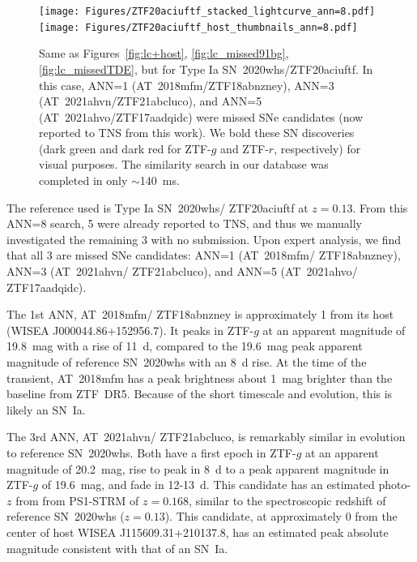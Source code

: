 \documentclass[twocolumn]{aastex63}
\begin{document}
\begin{figure}
    \centering
    \texttt{[image: Figures/ZTF20aciuftf\_stacked\_lightcurve\_ann=8.pdf]}
    \texttt{[image: Figures/ZTF20aciuftf\_host\_thumbnails\_ann=8.pdf]}
    \caption{
    Same as Figures~\ref{fig:lc+host}, \ref{fig:lc_missed91bg}, \ref{fig:lc_missedTDE}, but for Type Ia SN~2020whs/ZTF20aciuftf. In this case, ANN=1 (AT~2018mfm/ZTF18abnzney), ANN=3 (AT~2021ahvn/ZTF21abcluco), and ANN=5 (AT~2021ahvo/ZTF17aadqidc) were missed SNe candidates (now reported to TNS from this work). We bold these SN discoveries (dark green and dark red for ZTF-$g$ and ZTF-$r$, respectively) for visual purposes. The similarity search in our database was completed in only $\sim$140~ms.
    } 
    \label{fig:lc_missingSNe}
\end{figure}

The reference used is Type Ia SN~2020whs/ ZTF20aciuftf at $z=0.13$. From this ANN=8 search, 5 were already reported to TNS, and thus we manually investigated the remaining 3 with no submission. Upon expert analysis, we find that all 3 are missed SNe candidates: ANN=1 (AT~2018mfm/ ZTF18abnzney), ANN=3 (AT~2021ahvn/ ZTF21abcluco), and ANN=5 (AT~2021ahvo/ ZTF17aadqidc).

The 1st ANN, AT~2018mfm/ ZTF18abnzney is approximately 1 from its host (WISEA J000044.86+152956.7). It peaks in ZTF-$g$ at an apparent magnitude of 19.8~mag with a rise of 11~d, compared to the 19.6~mag peak apparent magnitude of reference SN~2020whs with an 8~d rise. At the time of the transient, AT~2018mfm has a peak brightness about 1~mag brighter than the baseline from ZTF~DR5. Because of the short timescale and evolution, this is likely an SN~Ia. \par

The 3rd ANN, AT~2021ahvn/ ZTF21abcluco, is remarkably similar in evolution to reference SN~2020whs. Both have a first epoch in ZTF-$g$ at an apparent magnitude of 20.2~mag, rise to peak in 8~d to a peak apparent magnitude in ZTF-$g$ of 19.6~mag, and fade in 12-13~d. This candidate has an estimated photo-$z$ from from PS1-STRM \citep{Beck2021} of $z=0.168$, similar to the spectroscopic redshift of reference SN~2020whs ($z=0.13$). This candidate, at approximately 0 from the center of host WISEA J115609.31+210137.8, has an estimated peak absolute magnitude consistent with that of an SN~Ia. \par
 
\end{document}
